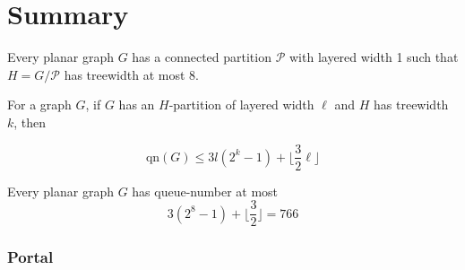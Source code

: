 \documentclass{beamer}
\begin{document}
	\section{Summary}
	\begin{frame}
		{
			\begin{theorem}
				Every planar graph $G$ has a connected partition $\mathcal{P}$ with layered width 1 such that $H = G/\mathcal{P}$ has treewidth at most 8.
			\end{theorem}
		}
		\vfill
		{
			\begin{theorem}
				For a graph $G$, if $G$ has an $H$-partition of layered width $\ell$ and $H$ has treewidth $k$, then 
				
				$$\text{qn}(G) \le 3l(2^k-1) + \lfloor \frac{3}{2} \ell \rfloor$$
			\end{theorem}
		}
		\vfill
		{
			\begin{theorem}
				Every planar graph $G$ has queue-number at most 
				$$3(2^8-1) + \lfloor \frac{3}{2} \rfloor = 766$$ 
			\end{theorem}
		}
	\end{frame}
	
	\begin{frame}
		\frametitle{Portal}
		\tableofcontents
	\end{frame}
	
\end{document}
